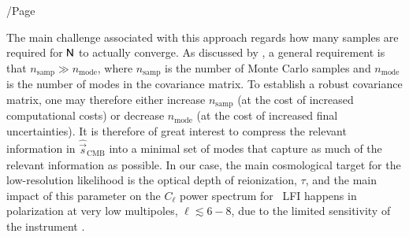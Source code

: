 /Page\documentclass[twocolumn]{aa}
\newcommand{\s}[0]{\vec{s}}
\newcommand{\N}[0]{\tens{N}}
\begin{document}
The main challenge associated with this approach regards how many
samples are required for $\N$ to actually converge. As discussed by
\citet{sellentin2016}, a general requirement is that
$n_{\mathrm{samp}} \gg n_{\mathrm{mode}}$, where $n_{\mathrm{samp}}$
is the number of Monte Carlo samples and $n_{\mathrm{mode}}$ is the
number of modes in the covariance matrix. To establish a robust
covariance matrix, one may therefore either increase
$n_{\mathrm{samp}}$ (at the cost of increased computational costs) or
decrease $n_{\mathrm{mode}}$ (at the cost of increased final
uncertainties). It is therefore of great interest to compress the
relevant information in $\hat{\s}_{\mathrm{CMB}}$ into a minimal set
of modes that capture as much of the relevant information as
possible. In our case, the main cosmological target for the
low-resolution likelihood is the optical depth of reionization,
$\tau$, and the main impact of this parameter on the $C_{\ell}$ power
spectrum for \Planck\ LFI happens in polarization at very low
multipoles, $\ell \lesssim 6-8$, due to the limited sensitivity of the
instrument \citep{planck2016-l05}.
\end{document}
